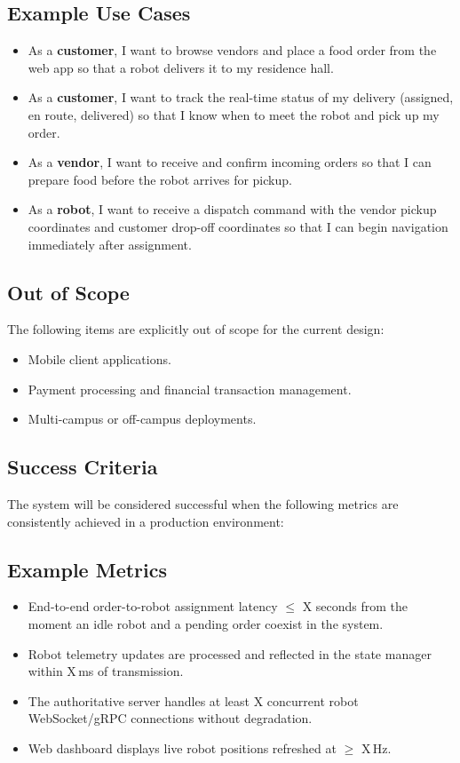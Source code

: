 \documentclass[12pt,a4paper]{article}
\begin{document}
\subsection*{Example Use Cases}
\begin{itemize}
  \item As a \textbf{customer}, I want to browse vendors and place a food order from the web app so that a robot delivers it to my residence hall.
  \item As a \textbf{customer}, I want to track the real-time status of my delivery (assigned, en route, delivered) so that I know when to meet the robot and pick up my order.
  \item As a \textbf{vendor}, I want to receive and confirm incoming orders so that I can prepare food before the robot arrives for pickup.
  \item As a \textbf{robot}, I want to receive a dispatch command with the vendor pickup coordinates and customer drop-off coordinates so that I can begin navigation immediately after assignment.
\end{itemize}
\subsection{Out of Scope}
The following items are explicitly out of scope for the current design:
\begin{itemize}
  \item Mobile client applications.
  \item Payment processing and financial transaction management.
  \item Multi-campus or off-campus deployments.
\end{itemize}

\subsection{Success Criteria}
The system will be considered successful when the following metrics are consistently achieved in a production environment:

\subsection*{Example Metrics}
\begin{itemize}
  \item End-to-end order-to-robot assignment latency $\leq$ X seconds from the moment an idle robot and a pending order coexist in the system.
  \item Robot telemetry updates are processed and reflected in the state manager within X\,ms of transmission.
  \item The authoritative server handles at least X concurrent robot WebSocket/gRPC connections without degradation.
  \item Web dashboard displays live robot positions refreshed at $\geq$ X\,Hz.
\end{itemize}
\newpage
\end{document}
